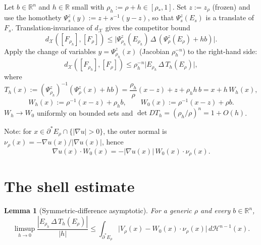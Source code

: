 \documentclass[11pt]{article}
\newtheorem{lemma}[theorem]{Lemma}
\theoremstyle{definition}
\newcommand{\R}{\mathbb{R}}
\newcommand{\rstar}{\rho_{*}}
\newcommand{\X}{\mathcal X}
\newcommand{\Hn}{\mathcal H^{n-1}}
\begin{document}
Let $b\in\R^n$ and $h\in\R$ small with $\rho_h:=\rho+h\in[\rstar,1]$. Set
$z:=z_\rho$ (frozen) and use the homothety
$\Psi_s^z(y):=z+s^{-1}(y-z)$, so that $\Psi_s^z(E_s)$ is a translate of
$F_s$. Translation-invariance of $d_\X$ gives the competitor bound
\[
   d_\X([F_{\rho_h}],[F_\rho])
   \le\bigl|\Psi^z_{\rho_h}(E_{\rho_h})\,\Delta\,(\Psi^z_\rho(E_\rho)+hb)\bigr|.
\]
Apply the change of variables $y=\Psi_{\rho_h}^z(x)$ (Jacobian $\rho_h^{-n}$)
to the right-hand side:
\begin{equation}\label{eq:pull-back}
   d_\X([F_{\rho_h}],[F_\rho])
   \le\rho_h^{-n}\bigl|E_{\rho_h}\,\Delta\,T_h(E_\rho)\bigr|,
\end{equation}
where
\begin{equation}\label{eq:Th}
   T_h(x):=(\Psi^z_{\rho_h})^{-1}(\Psi^z_\rho(x)+hb)
   =\frac{\rho_h}{\rho}(x-z)+z+\rho_h h\,b
   =x+h\,W_h(x),
\end{equation}
\begin{equation}\label{eq:Wh}
   W_h(x):=\rho^{-1}(x-z)+\rho_h b,\qquad
   W_0(x):=\rho^{-1}(x-z)+\rho b.
\end{equation}
$W_h\to W_0$ uniformly on bounded sets and $\det DT_h=(\rho_h/\rho)^n=1+O(h)$.

Note: for $x\in\partial^*E_\rho\cap\{|\nabla u|>0\}$, the outer normal is
$\nu_\rho(x)=-\nabla u(x)/|\nabla u(x)|$, hence
\begin{equation}\label{eq:W0-nu}
   \nabla u(x)\cdot W_0(x)=-|\nabla u(x)|\,W_0(x)\cdot\nu_\rho(x).
\end{equation}

\section{The shell estimate}\label{sec:bv-shell}

\begin{lemma}[Symmetric-difference asymptotic]\label{lem:shell}
For a generic $\rho$ and every $b\in\R^n$,
\begin{equation}\label{eq:shell-asymp}
   \limsup_{h\to 0}\frac{|E_{\rho_h}\,\Delta\,T_h(E_\rho)|}{|h|}
   \le\int_{\partial^*E_\rho}\bigl|V_\rho(x)-W_0(x)\cdot\nu_\rho(x)\bigr|\,d\Hn(x).
\end{equation}
\end{lemma}
\end{document}
